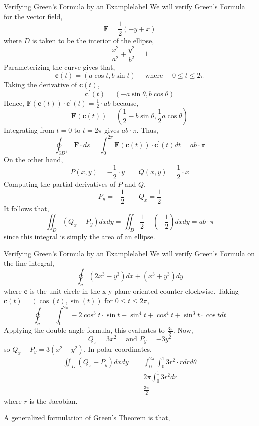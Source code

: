 \begin{ex}{Verifying Green's Formula by an Example}{label}
	We will verify Green's Formula for the vector field,
	\[\mathbf{F} = \frac{1}{2}(-y + x)\]
	where $D$  is taken to be the interior of the ellipse,
	\[\frac{x^2}{a^2}+\frac{y^2}{b^2}=1\]
	Parameterizing the curve gives that,
	\[\mathbf{c}(t)=(a \cos t, b \sin t) \quad \text{ where } \quad 0 \leq t \leq 2\pi\]
	Taking the derivative of $\mathbf{c}(t)$,
	\[\mathbf{c}^{\prime}(t) = (-a \sin \theta, b \cos \theta)\]
	Hence, $\mathbf{F}(\mathbf{c}(t)) \cdot \mathbf{c}^{\prime}(t) = \frac{1}{2} \cdot ab$ because,
	\[\mathbf{F}(\mathbf{c}(t)) = \left(\frac{1}{2} -b \sin \theta, \frac{1}{2} a \cos \theta\right)\]
	Integrating from $t = 0$ to $t = 2 \pi$ gives $ab \cdot \pi$. Thus,
	\[\oint_{\partial D^{+}} \mathbf{F} \cdot ds = \int_{0}^{2 \pi} \mathbf{F}(\mathbf{c}(t)) \cdot \mathbf{c}^{\prime}(t) dt = ab \cdot \pi\]
	On the other hand, 
	\[P(x,y) = -\frac{1}{2} \cdot y \quad \quad Q(x,y) = \frac{1}{2} \cdot x\]
	Computing the partial derivatives of $P$ and $Q$,
	\[P_y = -\frac{1}{2} \quad \quad Q_x = \frac{1}{2}\]
	It follows that,
	\[\iint_D (Q_x-P_y) d x d y = \iint_D \frac{1}{2} - \left(-\frac{1}{2}\right) d x d y = ab \cdot \pi\]
	since this integral is simply the area of an ellipse.
\end{ex}

\begin{ex}{Verifying Green's Formula by an Example}{label}
	We will verify Green's Formula on the line integral,
	\[\oint_{\mathbf{c}}\left(2 x^3-y^3\right) d x+\left(x^3+y^3\right) d y\]
	where $\mathbf{c}$ is the unit circle in the x-y plane oriented counter-clockwise. Taking $\mathbf{c}(t) = (\cos(t), \sin(t))$ for $0 \leq t \leq 2 \pi$,
	\[\oint_{\mathbf{c}} = \int_{0}^{2\pi} -2\cos^3t \cdot \sin t+\sin^4 t +\cos^4 t + \sin^3 t \cdot \cos t dt\]
	Applying the double angle formula, this evaluates to $\frac{3 \pi}{2}$. Now,
	\[Q_x = 3x^2 \quad \text{ and } P_y = -3y^2\]
	so $Q_x - P_y = 3(x^2 + y^2)$. In polar coordinates,
	\[\begin{aligned}
		\iint_D\left(Q_x-P_y\right) d x d y & =\int_0^{2 \pi} \int_0^1 3 r^2 \cdot r d r d \theta \\
		& = 2 \pi \int_0^1 3 r^2 d r \\
		& = \frac{3 \pi}{2}
		\end{aligned}\]
	where $r$ is the Jacobian.
\end{ex}

\hfill

\noindent A generalized formulation of Green's Theorem is that,

